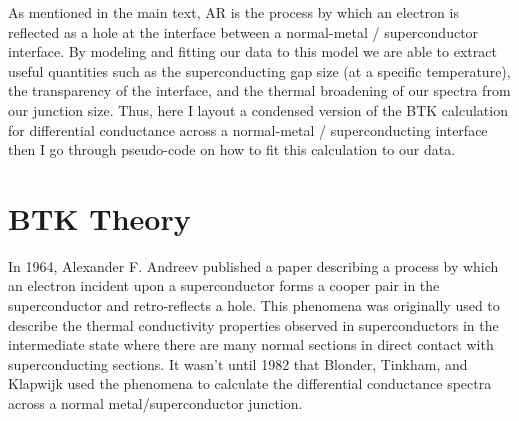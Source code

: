 As mentioned in the main text, \acl{AR} is the process by which an electron is reflected as a hole at the interface between a normal-metal / superconductor interface. By modeling and fitting our data to this model we are able to extract useful quantities such as the superconducting gap size (at a specific temperature), the transparency of the interface, and the thermal broadening of our spectra from our junction size. Thus, here I layout a condensed version of the \ac{BTK} calculation for differential conductance across a normal-metal / superconducting interface then I go through pseudo-code on how to fit this calculation to our data.

\section{BTK Theory}
In 1964, Alexander F. Andreev published a paper describing a process by which an electron incident upon a superconductor forms a cooper pair in the superconductor and retro-reflects a hole\cite{Andreev1964}. This phenomena was originally used to describe the thermal conductivity properties observed in superconductors in the intermediate state where there are many normal sections in direct contact with superconducting sections. It wasn't until 1982 that Blonder, Tinkham, and Klapwijk used the phenomena to calculate the differential conductance spectra across a normal metal/superconductor junction\cite{BTK}.\par

